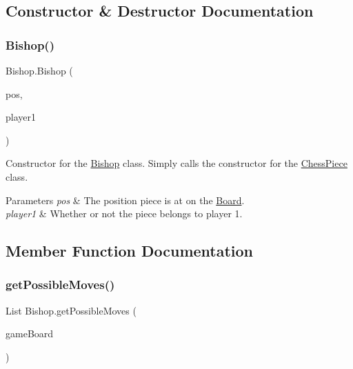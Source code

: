 \subsection{Constructor \& Destructor Documentation}
\mbox{\label{class_bishop_a08973295c3ebc313a9f767b74c3cb276}} 
\subsubsection{\texorpdfstring{Bishop()}{Bishop()}}
{\footnotesize\ttfamily Bishop.\+Bishop (\begin{DoxyParamCaption}\item[{@Not\+Null int \mbox{[}$\,$\mbox{]}}]{pos,  }\item[{boolean}]{player1 }\end{DoxyParamCaption})}

Constructor for the \mbox{\hyperlink{class_bishop}{Bishop}} class. Simply calls the constructor for the \mbox{\hyperlink{class_chess_piece}{Chess\+Piece}} class. 
\begin{DoxyParams}{Parameters}
{\em pos} & The position piece is at on the \mbox{\hyperlink{class_board}{Board}}. \\
\hline
{\em player1} & Whether or not the piece belongs to player 1. \\
\hline
\end{DoxyParams}


\subsection{Member Function Documentation}
\mbox{\label{class_bishop_a168bf9e524e798efb1d313fcd4a34e59}} 
\subsubsection{\texorpdfstring{get\+Possible\+Moves()}{getPossibleMoves()}}
{\footnotesize\ttfamily List Bishop.\+get\+Possible\+Moves (\begin{DoxyParamCaption}\item[{@Not\+Null \mbox{\hyperlink{class_board}{Board}}}]{game\+Board }\end{DoxyParamCaption})}

